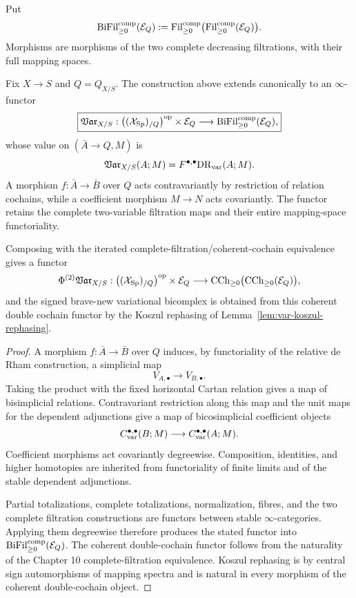 \begin{definition}
\label{def:var-bifiltered-target}
Put
\[
    \operatorname{BiFil}^{\mathrm{comp}}_{\ge0}(\mathcal E_Q)
    :=
    \operatorname{Fil}^{\mathrm{comp}}_{\ge0}
    \bigl(
      \operatorname{Fil}^{\mathrm{comp}}_{\ge0}(\mathcal E_Q)
    \bigr).
\]
Morphisms are morphisms of the two complete decreasing filtrations, with their full mapping spaces.
\end{definition}

\begin{theorem}
\label{thm:var-infinity-functor}
Fix \(X\to S\) and \(Q=Q_{X/S}\). The construction above extends canonically to an \(\infty\)-functor
\[
    \boxed{
    \mathfrak{Var}_{X/S}:
    \bigl((\mathcal{X}_{\mathrm{Sp}})_{/Q}\bigr)^{\mathrm{op}}
    \times
    \mathcal E_Q
    \longrightarrow
    \operatorname{BiFil}^{\mathrm{comp}}_{\ge0}(\mathcal E_Q),
    }
\]
whose value on \((\bar A\to Q,M)\) is
\[
    \mathfrak{Var}_{X/S}(A;M)
    =
    F^{\bullet,\bullet}\mathrm{DR}_{\mathrm{var}}(A;M).
\]
A morphism \(f:\bar A\to\bar B\) over \(Q\) acts contravariantly by restriction of relation cochains, while a coefficient morphism \(M\to N\) acts covariantly. The functor retains the complete two-variable filtration maps and their entire mapping-space functoriality.

Composing with the iterated complete-filtration/coherent-cochain equivalence gives a functor
\[
    \Phi^{(2)}\mathfrak{Var}_{X/S}:
    \bigl((\mathcal{X}_{\mathrm{Sp}})_{/Q}\bigr)^{\mathrm{op}}
    \times
    \mathcal E_Q
    \longrightarrow
    \operatorname{CCh}_{\ge0}
    \bigl(\operatorname{CCh}_{\ge0}(\mathcal E_Q)\bigr),
\]
and the signed brave-new variational bicomplex is obtained from this coherent double cochain functor by the Koszul rephasing of Lemma~\ref{lem:var-koszul-rephasing}.
\end{theorem}

\begin{proof}
A morphism \(f:\bar A\to\bar B\) over \(Q\) induces, by functoriality of the relative de Rham construction, a simplicial map
\[
    V_{A,\bullet}\longrightarrow V_{B,\bullet}.
\]
Taking the product with the fixed horizontal Cartan relation gives a map of bisimplicial relations. Contravariant restriction along this map and the unit maps for the dependent adjunctions give a map of bicosimplicial coefficient objects
\[
    C_{\mathrm{var}}^{\bullet,\bullet}(B;M)
    \longrightarrow
    C_{\mathrm{var}}^{\bullet,\bullet}(A;M).
\]
Coefficient morphisms act covariantly degreewise. Composition, identities, and higher homotopies are inherited from functoriality of finite limits and of the stable dependent adjunctions.

Partial totalizations, complete totalizations, normalization, fibres, and the two complete filtration constructions are functors between stable \(\infty\)-categories. Applying them degreewise therefore produces the stated functor into \(\operatorname{BiFil}^{\mathrm{comp}}_{\ge0}(\mathcal E_Q)\). The coherent double-cochain functor follows from the naturality of the Chapter 10 complete-filtration equivalence. Koszul rephasing is by central sign automorphisms of mapping spectra and is natural in every morphism of the coherent double-cochain object.
\end{proof}

